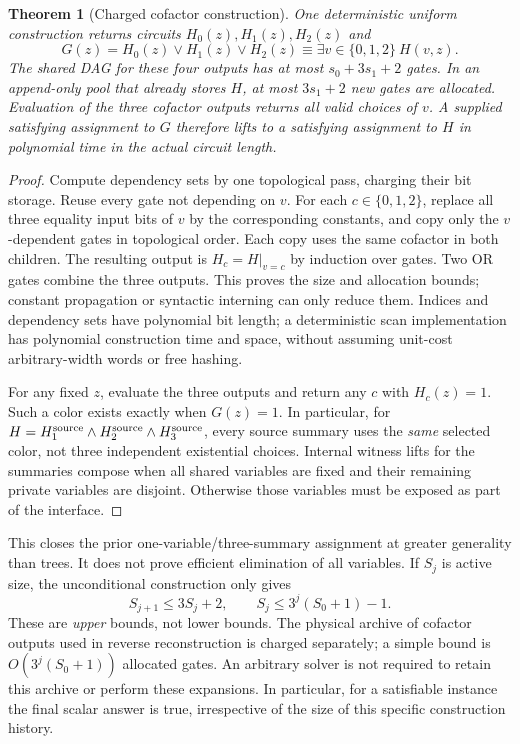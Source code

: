 \documentclass[11pt]{article}
\newtheorem{theorem}{Theorem}
\newcommand{\Col}{\{0,1,2\}}
\begin{document}
\begin{theorem}[Charged cofactor construction]\label{thm:cofactor}
One deterministic uniform construction returns circuits
$H_0(z),H_1(z),H_2(z)$ and
\[
 G(z)=H_0(z)\lor H_1(z)\lor H_2(z)
      \equiv\exists v\in\Col\ H(v,z).
\]
The shared DAG for these four outputs has at most $s_0+3s_1+2$ gates.
In an append-only pool that already stores $H$, at most $3s_1+2$ new gates
are allocated. Evaluation of the three cofactor outputs returns all valid
choices of $v$. A supplied satisfying assignment to $G$ therefore lifts to a
satisfying assignment to $H$ in polynomial time in the actual circuit length.
\end{theorem}
\begin{proof}
Compute dependency sets by one topological pass, charging their bit storage.
Reuse every gate not depending on $v$. For each $c\in\Col$, replace all
three equality input bits of $v$ by the corresponding constants, and copy
only the $v$-dependent gates in topological order. Each copy uses the same
cofactor in both children. The resulting output is $H_c=H|_{v=c}$ by
induction over gates. Two OR gates combine the three outputs. This proves
the size and allocation bounds; constant propagation or syntactic interning
can only reduce them. Indices and dependency sets have polynomial bit length;
a deterministic scan implementation has polynomial construction time and space,
without assuming unit-cost arbitrary-width words or free hashing.

For any fixed $z$, evaluate the three outputs and return any $c$ with
$H_c(z)=1$. Such a color exists exactly when $G(z)=1$. In particular, for
$H=H_1^{\rm source}\land H_2^{\rm source}\land H_3^{\rm source}$, every
source summary uses the \emph{same} selected color, not three independent
existential choices. Internal witness lifts for the summaries compose when
all shared variables are fixed and their remaining private variables are
disjoint. Otherwise those variables must be exposed as part of the interface.
\end{proof}

This closes the prior one-variable/three-summary assignment at greater
generality than trees. It does not prove efficient elimination of all
variables. If $S_j$ is active size, the unconditional construction only gives
\[
 S_{j+1}\le3S_j+2,\qquad S_j\le3^j(S_0+1)-1.
\]
These are \emph{upper} bounds, not lower bounds. The physical archive of
cofactor outputs used in reverse reconstruction is charged separately; a
simple bound is $O(3^j(S_0+1))$ allocated gates. An arbitrary solver is not
required to retain this archive or perform these expansions. In particular,
for a satisfiable instance the final scalar answer is true, irrespective of
the size of this specific construction history.
\end{document}
